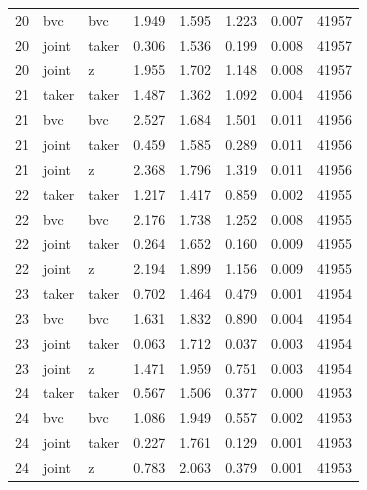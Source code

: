 \begin{tabular}{rllrrrrr}
20 & bvc & bvc & 1.949 & 1.595 & 1.223 & 0.007 & 41957 \\
20 & joint & taker & 0.306 & 1.536 & 0.199 & 0.008 & 41957 \\
20 & joint & z & 1.955 & 1.702 & 1.148 & 0.008 & 41957 \\
21 & taker & taker & 1.487 & 1.362 & 1.092 & 0.004 & 41956 \\
21 & bvc & bvc & 2.527 & 1.684 & 1.501 & 0.011 & 41956 \\
21 & joint & taker & 0.459 & 1.585 & 0.289 & 0.011 & 41956 \\
21 & joint & z & 2.368 & 1.796 & 1.319 & 0.011 & 41956 \\
22 & taker & taker & 1.217 & 1.417 & 0.859 & 0.002 & 41955 \\
22 & bvc & bvc & 2.176 & 1.738 & 1.252 & 0.008 & 41955 \\
22 & joint & taker & 0.264 & 1.652 & 0.160 & 0.009 & 41955 \\
22 & joint & z & 2.194 & 1.899 & 1.156 & 0.009 & 41955 \\
23 & taker & taker & 0.702 & 1.464 & 0.479 & 0.001 & 41954 \\
23 & bvc & bvc & 1.631 & 1.832 & 0.890 & 0.004 & 41954 \\
23 & joint & taker & 0.063 & 1.712 & 0.037 & 0.003 & 41954 \\
23 & joint & z & 1.471 & 1.959 & 0.751 & 0.003 & 41954 \\
24 & taker & taker & 0.567 & 1.506 & 0.377 & 0.000 & 41953 \\
24 & bvc & bvc & 1.086 & 1.949 & 0.557 & 0.002 & 41953 \\
24 & joint & taker & 0.227 & 1.761 & 0.129 & 0.001 & 41953 \\
24 & joint & z & 0.783 & 2.063 & 0.379 & 0.001 & 41953 \\
\bottomrule
\end{tabular}
